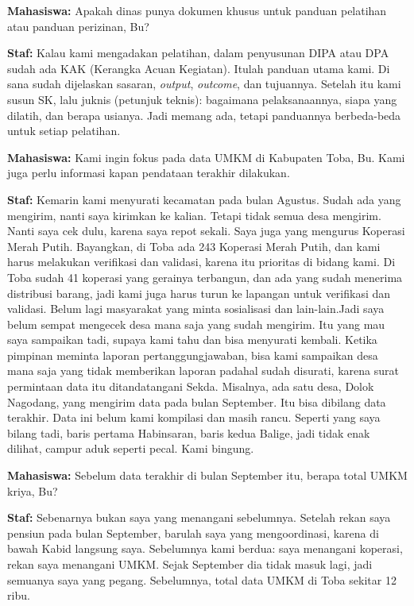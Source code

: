 {\noindent \textbf{Mahasiswa:} Apakah dinas punya dokumen khusus untuk panduan pelatihan atau panduan perizinan, Bu?

\noindent \textbf{Staf:} Kalau kami mengadakan pelatihan, dalam penyusunan DIPA atau DPA sudah ada KAK (Kerangka Acuan Kegiatan). Itulah panduan utama kami. Di sana sudah dijelaskan sasaran, \textit{output}, \textit{outcome}, dan tujuannya. Setelah itu kami susun SK, lalu juknis (petunjuk teknis): bagaimana pelaksanaannya, siapa yang dilatih, dan berapa usianya. Jadi memang ada, tetapi panduannya berbeda-beda untuk setiap pelatihan.

\noindent \textbf{Mahasiswa:} Kami ingin fokus pada data UMKM di Kabupaten Toba, Bu. Kami juga perlu informasi kapan pendataan terakhir dilakukan.

\noindent \textbf{Staf:} Kemarin kami menyurati kecamatan pada bulan Agustus. Sudah ada yang mengirim, nanti saya kirimkan ke kalian. Tetapi tidak semua desa mengirim. Nanti saya cek dulu, karena saya repot sekali. Saya juga yang mengurus Koperasi Merah Putih. Bayangkan, di Toba ada 243 Koperasi Merah Putih, dan kami harus melakukan verifikasi dan validasi, karena itu prioritas di bidang kami. Di Toba sudah 41 koperasi yang gerainya terbangun, dan ada yang sudah menerima distribusi barang, jadi kami juga harus turun ke lapangan untuk verifikasi dan validasi. Belum lagi masyarakat yang minta sosialisasi dan lain-lain.Jadi saya belum sempat mengecek desa mana saja yang sudah mengirim. Itu yang mau saya sampaikan tadi, supaya kami tahu dan bisa menyurati kembali. Ketika pimpinan meminta laporan pertanggungjawaban, bisa kami sampaikan desa mana saja yang tidak memberikan laporan padahal sudah disurati, karena surat permintaan data itu ditandatangani Sekda. Misalnya, ada satu desa, Dolok Nagodang, yang mengirim data pada bulan September. Itu bisa dibilang data terakhir. Data ini belum kami kompilasi dan masih rancu. Seperti yang saya bilang tadi, baris pertama Habinsaran, baris kedua Balige, jadi tidak enak dilihat, campur aduk seperti pecal. Kami bingung.

\noindent \textbf{Mahasiswa:} Sebelum data terakhir di bulan September itu, berapa total UMKM kriya, Bu?

\noindent \textbf{Staf:} Sebenarnya bukan saya yang menangani sebelumnya. Setelah rekan saya pensiun pada bulan September, barulah saya yang mengoordinasi, karena di bawah Kabid langsung saya. Sebelumnya kami berdua: saya menangani koperasi, rekan saya menangani UMKM. Sejak September dia tidak masuk lagi, jadi semuanya saya yang pegang. Sebelumnya, total data UMKM di Toba sekitar 12 ribu.

}
